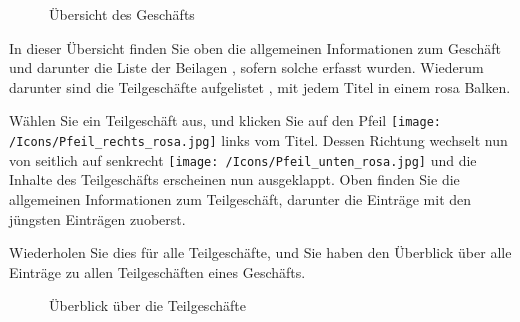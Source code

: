 \begin{figure}[H]
\caption{Übersicht des Geschäfts}
\end{figure}

In dieser Übersicht finden Sie oben die allgemeinen Informationen zum Geschäft  und darunter die Liste der Beilagen , sofern solche erfasst wurden. Wiederum darunter sind die Teilgeschäfte aufgelistet , mit jedem Titel in einem rosa Balken.

\vspace{\baselineskip}

Wählen Sie ein Teilgeschäft aus, und klicken Sie auf den Pfeil \texttt{[image: /Icons/Pfeil\_rechts\_rosa.jpg]} links vom Titel. Dessen Richtung wechselt nun von seitlich auf senkrecht \texttt{[image: /Icons/Pfeil\_unten\_rosa.jpg]} und die Inhalte des Teilgeschäfts erscheinen nun ausgeklappt. Oben finden Sie die allgemeinen Informationen zum Teilgeschäft, darunter die Einträge mit den jüngsten Einträgen zuoberst.

\vspace{\baselineskip}

Wiederholen Sie dies für alle Teilgeschäfte, und Sie haben den Überblick über alle Einträge zu allen Teilgeschäften eines Geschäfts.

\begin{figure}[H]
\caption{Überblick über die Teilgeschäfte}
\end{figure}

